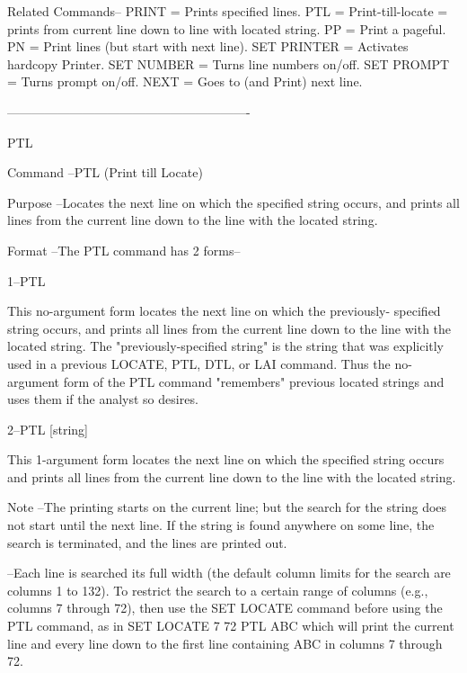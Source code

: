 Related Commands--
          PRINT           = Prints specified lines.
          PTL             = Print-till-locate =
                            prints from current line down
                            to line with located string.
          PP              = Print a pageful.
          PN              = Print lines (but start
                            with next line).
          SET PRINTER     = Activates hardcopy Printer.
          SET NUMBER      = Turns line numbers on/off.
          SET PROMPT      = Turns prompt on/off.
          NEXT            = Goes to (and Print) next line.
 
----------------------------------------------------------
 
PTL
 
Command --PTL (Print till Locate)
 
Purpose --Locates the next line on which
          the specified string occurs, and
          prints all lines from the current line
          down to the line with the located string.
 
Format  --The PTL command has 2 forms--
 
       1--PTL
 
          This no-argument form locates the
          next line on which the previously-
          specified string occurs, and
          prints all lines from the current line
          down to the line with the located string.
          The "previously-specified string" is
          the string that was explicitly used in a
          previous LOCATE, PTL, DTL, or LAI command.
          Thus the no-argument form of the PTL command
          "remembers" previous located strings
          and uses them if the analyst so desires.
 
       2--PTL     [string]
 
          This 1-argument form locates the
          next line on which the specified
          string occurs and  prints all lines
          from the current line down to the line
          with the located string.
 
Note    --The printing starts on the current line;
          but the search for the string
          does not start until the next line.
          If the string is found anywhere on
          some line, the search is terminated,
          and the lines are printed out.
 
        --Each line is searched its full width
          (the default column limits for the search
          are columns 1 to 132).
          To restrict the search to a certain range  of
          columns (e.g., columns 7 through 72), then
          use the SET LOCATE command before using
          the PTL command, as in
             SET LOCATE 7 72
             PTL ABC
          which will print the current line
          and every line down to the first
          line containing ABC in columns
          7 through 72.
 

